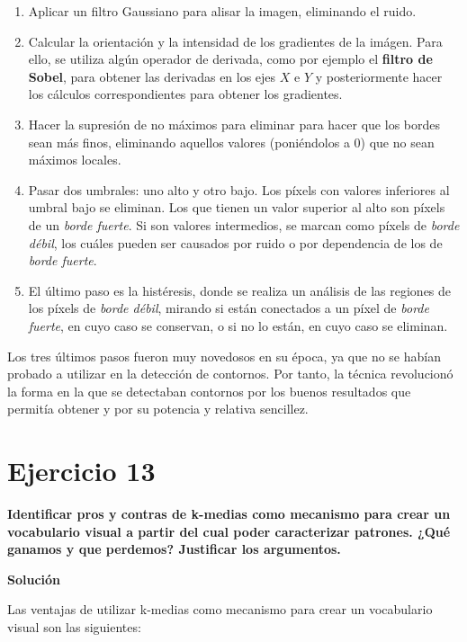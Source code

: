 \documentclass[11pt,a4paper]{article}
\newcommand{\answer}{\noindent\textbf{Solución}}
\newcommand{\question}[1]{\noindent\textbf{#1}}
\newcommand{\nonumbersection}[1]{\section*{#1}\addcontentsline{toc}{section}{#1}}
\begin{document}
\begin{enumerate}
	\item Aplicar un filtro Gaussiano para alisar la imagen, eliminando el ruido.
	\item Calcular la orientación y la intensidad de los gradientes de la imágen. Para ello, se utiliza
	algún operador de derivada, como por ejemplo el \textbf{filtro de Sobel}, para obtener las derivadas en
	los ejes $X$ e $Y$ y posteriormente hacer los cálculos correspondientes para obtener los gradientes.
	\item Hacer la supresión de no máximos para eliminar para hacer que los bordes sean más finos, eliminando
	aquellos valores (poniéndolos a 0) que no sean máximos locales.
	\item Pasar dos umbrales: uno alto y otro bajo. Los píxels con valores inferiores al umbral bajo se eliminan. Los
	que tienen un valor superior al alto son píxels de un \textit{borde fuerte}. Si son valores intermedios, se marcan
	como píxels de \textit{borde débil}, los cuáles pueden ser causados por ruido o por dependencia de los de
	\textit{borde fuerte}.
	\item El último paso es la histéresis, donde se realiza un análisis de las regiones de los píxels de \textit{borde débil},
	mirando si están conectados a un píxel de \textit{borde fuerte}, en cuyo caso se conservan, o si no lo están, en cuyo
	caso se eliminan.
\end{enumerate}

Los tres últimos pasos fueron muy novedosos en su época, ya que no se habían probado a utilizar en la detección
de contornos. Por tanto, la técnica revolucionó la forma en la que se detectaban contornos por los buenos resultados
que permitía obtener y por su potencia y relativa sencillez.

\nonumbersection{Ejercicio 13}

\question{Identificar pros y contras de k-medias como mecanismo para crear un
vocabulario visual a partir del cual poder caracterizar patrones. ¿Qué
ganamos y que perdemos? Justificar los argumentos.}

\answer

Las ventajas de utilizar k-medias como mecanismo para crear un vocabulario visual son las siguientes:
\end{document}
